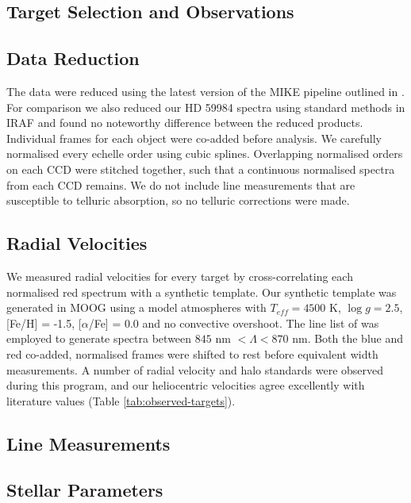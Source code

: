 \documentclass{emulateapj}
\begin{document}

\subsection{Target Selection and Observations}


\subsection{Data Reduction}
The data were reduced using the latest version of the MIKE pipeline outlined in \citet{Kelson;2003}. For comparison we also reduced our HD 59984 spectra using standard methods in \textsc{IRAF} and found no noteworthy difference between the reduced products. Individual frames for each object were co-added before analysis. We carefully normalised every echelle order using cubic splines. Overlapping normalised orders on each CCD were stitched together, such that a continuous normalised spectra from each CCD remains. We do not include line measurements that are susceptible to telluric absorption, so no telluric corrections were made.

\subsection{Radial Velocities}
We measured radial velocities for every target by cross-correlating each normalised red  spectrum with a synthetic template. Our synthetic template was generated in \textsc{MOOG} using a \citet{Castelli-Kurucz;2004} model atmospheres with $T_{eff} = 4500$ K, $\log{g} = 2.5$, [Fe/H] = -1.5, [$\alpha$/Fe] = 0.0 and no convective overshoot. The line list of \citet{Kirby;et-al_2008} was employed to generate spectra between $845$ nm $< \Lambda < 870$ nm. Both the blue and red co-added, normalised frames were shifted to rest before equivalent width measurements. A number of radial velocity and halo standards were observed during this program, and our heliocentric velocities agree excellently with literature values (Table \ref{tab:observed-targets}).

\subsection{Line Measurements}




\subsection{Stellar Parameters}
\end{document}
